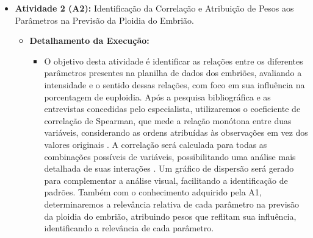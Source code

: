 \begin{itemize}
\begin{itemize}
      \item \textbf{Atividade 2 (A2):} Identificação da Correlação e Atribuição de Pesos aos Parâmetros na Previsão da Ploidia do Embrião.
      \begin{itemize}
        \item \textbf{Detalhamento da Execução:} 
        \begin{itemize}
          \item O objetivo desta atividade é identificar as relações entre os diferentes parâmetros presentes na planilha de dados dos embriões, avaliando a intensidade e o sentido dessas relações, com foco em sua influência na porcentagem de euploidia. Após a pesquisa bibliográfica e as entrevistas concedidas pelo especialista, utilizaremos o coeficiente de correlação de Spearman, que mede a relação monótona entre duas variáveis, considerando as ordens atribuídas às observações em vez dos valores originais \cite{sousa2019}. A correlação será calculada para todas as combinações possíveis de variáveis, possibilitando uma análise mais detalhada de suas interações \cite{sousa2019}. Um gráfico de dispersão será gerado para complementar a análise visual, facilitando a identificação de padrões. Também com o conhecimento adquirido pela A1, determinaremos a relevância relativa de cada parâmetro na previsão da ploidia do embrião, atribuindo pesos que reflitam sua influência, identificando a relevância de cada parâmetro.
        \end{itemize}


\end{itemize}
\end{itemize}
\end{itemize}
